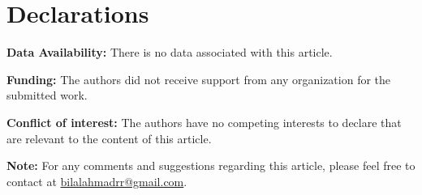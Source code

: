 \documentclass[12pt]{article}
\theoremstyle{plain}
\theoremstyle{definition}
\begin{document}
	
	
	
	\section*{Declarations}
	\noindent \textbf{Data Availability:}	There is no data associated with this article.
	
	\medskip
	
	\noindent \textbf{Funding:} The authors did not receive support from any organization for the submitted work.
	
	\medskip
	
	\noindent \textbf{Conflict of interest:} The authors have no competing interests to declare that are relevant to the content of this article.
	
	\medskip
	
	\noindent\textbf{Note:} For any comments and suggestions regarding this article, please feel free to contact at \href{mailto:bilalahmadrr@gmail.com}{bilalahmadrr@gmail.com}.
	
\end{document}
